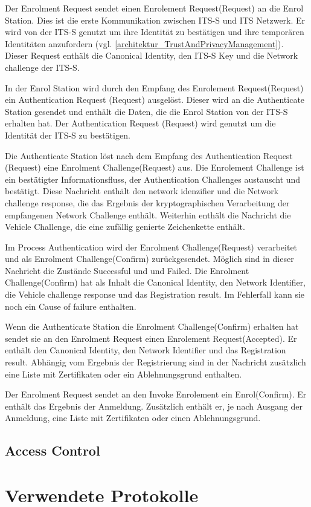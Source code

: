 Der Enrolment Request sendet einen Enrolement Request(Request) an die Enrol Station. Dies ist die erste Kommunikation zwischen \ac{ITS-S} und \ac{ITS} Netzwerk. Er wird von der \ac{ITS-S} genutzt um ihre Identität zu bestätigen und ihre temporären Identitäten anzufordern (vgl. \autoref{architektur_TrustAndPrivacyManagement}). Dieser Request enthält die Canonical Identity, den \ac{ITS-S} Key und die Network challenge der \ac{ITS-S}. 

In der Enrol Station wird durch den Empfang des Enrolement Request(Request) ein Authentication Request (Request) ausgelöst. Dieser wird an die Authenticate Station gesendet und enthält die Daten, die die Enrol Station von der \ac{ITS-S} erhalten hat. Der Authentication Request (Request) wird genutzt um die Identität der \ac{ITS-S} zu bestätigen.

Die Authenticate Station löst nach dem Empfang des Authentication Request (Request) eine Enrolment Challenge(Request) aus. Die Enrolement Challenge ist ein  bestätigter Informationsfluss, der Authentication Challenges austauscht und bestätigt.  Diese Nachricht enthält den network idenzifier  und die Network challenge response, die das Ergebnis der kryptographischen Verarbeitung der empfangenen Network Challenge enthält. Weiterhin enthält die Nachricht die Vehicle Challenge, die eine zufällig genierte  Zeichenkette enthält.

Im Process Authentication wird der Enrolment Challenge(Request) verarbeitet und als Enrolment Challenge(Confirm) zurückgesendet. Möglich sind in dieser Nachricht die Zustände Successful und und Failed. Die  Enrolment Challenge(Confirm) hat als Inhalt die Canonical Identity, den Network Identifier, die Vehicle challenge response und das Registration result. Im Fehlerfall kann sie noch  ein Cause of failure enthalten.

Wenn die Authenticate Station die Enrolment Challenge(Confirm) erhalten hat sendet sie an den Enrolment Request einen Enrolement Request(Accepted). Er enthält den Canonical Identity, den Network Identifier und das Registration result. Abhängig vom Ergebnis der Registrierung sind in der Nachricht zusätzlich eine Liste mit Zertifikaten oder ein Ablehnungsgrund enthalten.

Der Enrolment Request sendet an den Invoke Enrolement ein Enrol(Confirm). Er enthält das Ergebnis der Anmeldung. Zusätzlich enthält er, je nach Ausgang der Anmeldung, eine Liste mit Zertifikaten oder einen Ablehnungsgrund.







\subsection{Access Control}

\section{Verwendete Protokolle}




